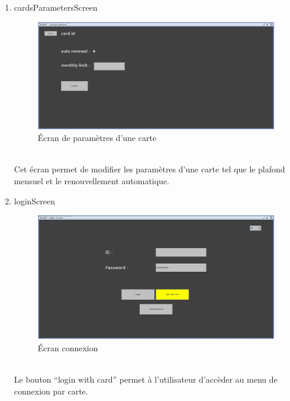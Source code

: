 \documentclass[../rapport.tex]{subfiles}
\begin{document}
\begin{enumerate}
	\item{cardsParametersScreen}\\
	\begin{figure}[h!]
		\centering\includegraphics[scale=0.15]{ressources/photos_diagrammes/extensionTheo/gui1/cardsParametres.jpg}
		\caption{Écran de paramètres d'une carte}
	\end{figure}\\
Cet écran permet de modifier les paramètres d'une carte tel que le plafond mensuel et le renouvellement automatique.

	\item{loginScreen}\\
	\begin{figure}[h!]
		\centering\includegraphics[scale=0.15]{ressources/photos_diagrammes/extensionTheo/gui1/login.jpg}
		\caption{Écran connexion}
	\end{figure}\\
Le bouton ``login with card'' permet à l'utilisateur d'accèder au menu de connexion par carte.


\end{enumerate}
\end{document}

